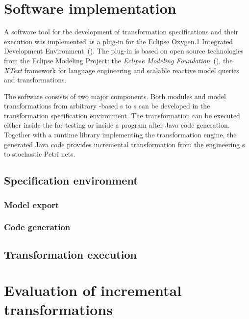 \section{Software implementation}

A software tool for the development of transformation specifications and their execution was implemented as a plug-in for the Eclipse Oxygen.1 Integrated Development Environment~(). The plug-in is based on open source technologies from the Eclipse Modeling Project: the \emph{Eclipse Modeling Foundation}~(), the \emph{XText} framework for language engineering and \emph{} scalable reactive model queries and transformations.

The software consists of two major components. Both  modules and model transformations from arbitrary -based s to s can be developed in the transformation specification environment. The transformation can be executed either inside the  for testing or inside a  program after Java code generation. Together with a runtime library implementing the transformation engine, the generated Java code provides incremental transformation from the engineering s to stochastic Petri nets.

\todo*{}

\subsection{Specification environment}

\subsubsection{Model export}

\subsubsection{Code generation}

\subsection{Transformation execution}

\section{Evaluation of incremental transformations}

